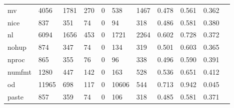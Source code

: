 \begin{longtable}{lp{1.10cm}p{1.10cm}p{1.10cm}p{1.10cm}p{1.10cm}p{1.10cm}p{1.10cm}p{1.10cm}p{1.10cm}p{1.10cm}}
mv        &                   4056 &                               1781 &                               270 &                                0 &                               538 &                            1467 &                             0.478 &                                 0.561 &                               0.362 \\
nice      &                    837 &                                351 &                                74 &                                0 &                                94 &                             318 &                             0.486 &                                 0.581 &                               0.380 \\
nl        &                   6094 &                               1656 &                               453 &                                0 &                              1721 &                            2264 &                             0.602 &                                 0.728 &                               0.372 \\
nohup     &                    874 &                                347 &                                74 &                                0 &                               134 &                             319 &                             0.501 &                                 0.603 &                               0.365 \\
nproc     &                    865 &                                355 &                                76 &                                0 &                                96 &                             338 &                             0.496 &                                 0.590 &                               0.391 \\
numfmt    &                   1280 &                                447 &                               142 &                                0 &                               163 &                             528 &                             0.536 &                                 0.651 &                               0.412 \\
od        &                  11965 &                                698 &                               117 &                                0 &                             10606 &                             544 &                             0.713 &                                 0.942 &                               0.045 \\
paste     &                    857 &                                359 &                                74 &                                0 &                               106 &                             318 &                             0.485 &                                 0.581 &                               0.371 \\

\end{longtable}
